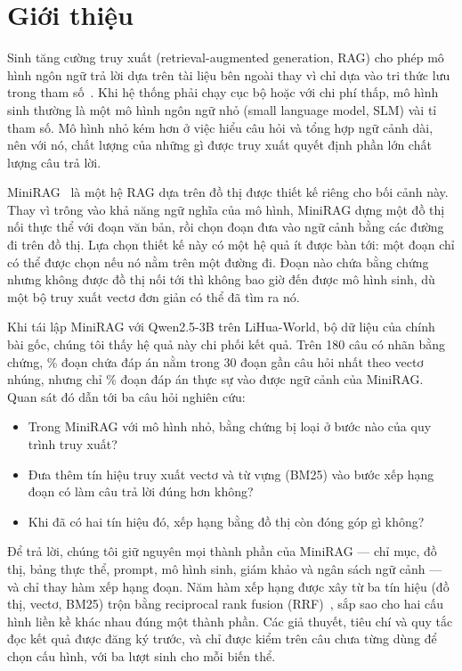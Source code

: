 \section{Giới thiệu}\label{sec:intro}

Sinh tăng cường truy xuất (retrieval-augmented generation, RAG) cho phép mô hình ngôn ngữ trả lời dựa trên tài liệu bên ngoài thay vì chỉ dựa vào tri thức lưu trong tham số~\cite{lewis2020rag}.
Khi hệ thống phải chạy cục bộ hoặc với chi phí thấp, mô hình sinh thường là một mô hình ngôn ngữ nhỏ (small language model, SLM) vài tỉ tham số.
Mô hình nhỏ kém hơn ở việc hiểu câu hỏi và tổng hợp ngữ cảnh dài, nên với nó, chất lượng của những gì được truy xuất quyết định phần lớn chất lượng câu trả lời.

MiniRAG~\cite{fan2025minirag} là một hệ RAG dựa trên đồ thị được thiết kế riêng cho bối cảnh này.
Thay vì trông vào khả năng ngữ nghĩa của mô hình, MiniRAG dựng một đồ thị nối thực thể với đoạn văn bản, rồi chọn đoạn đưa vào ngữ cảnh bằng các đường đi trên đồ thị.
Lựa chọn thiết kế này có một hệ quả ít được bàn tới: một đoạn chỉ có thể được chọn nếu nó nằm trên một đường đi.
Đoạn nào chứa bằng chứng nhưng không được đồ thị nối tới thì không bao giờ đến được mô hình sinh, dù một bộ truy xuất vectơ đơn giản có thể đã tìm ra nó.

Khi tái lập MiniRAG với Qwen2.5-3B trên LiHua-World, bộ dữ liệu của chính bài gốc, chúng tôi thấy hệ quả này chi phối kết quả.
Trên 180 câu có nhãn bằng chứng, \retVecTopThirty\% đoạn chứa đáp án nằm trong 30 đoạn gần câu hỏi nhất theo vectơ nhúng, nhưng chỉ \retChunkBase\% đoạn đáp án thực sự vào được ngữ cảnh của MiniRAG.
Quan sát đó dẫn tới ba câu hỏi nghiên cứu:
\begin{itemize}
  \item[\textbf{RQ1}] Trong MiniRAG với mô hình nhỏ, bằng chứng bị loại ở bước nào của quy trình truy xuất?
  \item[\textbf{RQ2}] Đưa thêm tín hiệu truy xuất vectơ và từ vựng (BM25) vào bước xếp hạng đoạn có làm câu trả lời đúng hơn không?
  \item[\textbf{RQ3}] Khi đã có hai tín hiệu đó, xếp hạng bằng đồ thị còn đóng góp gì không?
\end{itemize}

Để trả lời, chúng tôi giữ nguyên mọi thành phần của MiniRAG --- chỉ mục, đồ thị, bảng thực thể, prompt, mô hình sinh, giám khảo và ngân sách ngữ cảnh --- và chỉ thay hàm xếp hạng đoạn.
Năm hàm xếp hạng được xây từ ba tín hiệu (đồ thị, vectơ, BM25) trộn bằng reciprocal rank fusion (RRF)~\cite{cormack2009rrf}, sắp sao cho hai cấu hình liền kề khác nhau đúng một thành phần.
Các giả thuyết, tiêu chí và quy tắc đọc kết quả được đăng ký trước, và chỉ được kiểm trên \nHeld{} câu chưa từng dùng để chọn cấu hình, với ba lượt sinh cho mỗi biến thể.


